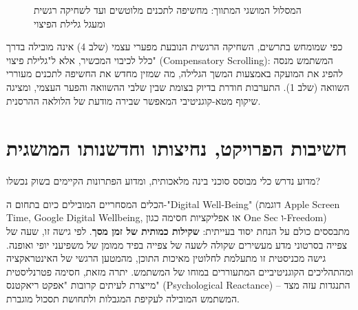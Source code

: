 \begin{figure}[H]
\begin{LTR}
\end{LTR}
\caption{המסלול המושגי המתווך: מחשיפה לתכנים מלוטשים ועד לשחיקה רגשית ומעגל גלילת הפיצוי}
\label{fig:conceptual_pathway}
\end{figure}

כפי שמומחש בתרשים, השחיקה הרגשית הנובעת מפערי עצמי (שלב 4) אינה מובילה בדרך כלל לכיבוי המכשיר, אלא ל"גלילת פיצוי" (\textenglish{Compensatory Scrolling}): המשתמש מנסה להפיג את המועקה באמצעות המשך הגלילה, מה שמזין מחדש את החשיפה לתכנים מעוררי השוואה (שלב 1). התערבות \projectname{} חודרת בדיוק בצומת שבין שלבי ההשוואה והפער העצמי, ומציגה שיקוף מטא-קוגניטיבי המאפשר שבירה מודעת של הלולאה ההרסנית.

\section{חשיבות הפרויקט, נחיצותו וחדשנותו המושגית}
\label{sec:intro_significance}
מדוע נדרש כלי מבוסס סוכני בינה מלאכותית, ומדוע הפתרונות הקיימים בשוק נכשלו?

הכלים המסחריים המובילים כיום בתחום ה-"\textenglish{Digital Well-Being}" (דוגמת \textenglish{Apple Screen Time}, \textenglish{Google Digital Wellbeing}, או אפליקציות חסימה כגון \textenglish{One Sec} ו-\textenglish{Freedom}) מתבססים כולם על הנחת יסוד בעייתית: \textbf{שקילות כמותית של זמן מסך}. לפי גישה זו, שעה של צפייה בסרטוני מדע מעשירים שקולה לשעה של צפייה בפיד ממומן של משפיעני יופי ואופנה. גישה מכניסטית זו מתעלמת לחלוטין מאיכות התוכן, מהמטען הרגשי של האינטראקציה ומהתהליכים הקוגניטיביים המתעוררים במוחו של המשתמש. יתרה מזאת, חסימה פטרנליסטית מייצרת לעיתים קרובות "אפקט ריאקטנס" (\textenglish{Psychological Reactance}) -- התנגדות עזה מצד המשתמש המובילה לעקיפת המגבלות ולתחושת תסכול מוגברת.

